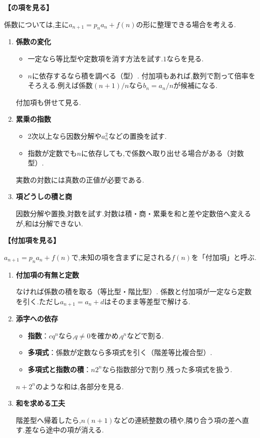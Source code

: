   \medskip
  \noindent \textbf{【の項を見る】}

  係数については,主に$a_{n+1}=p_na_n+f(n)$の形に整理できる場合を考える.
  \begin{enumerate}
    \item \textbf{係数の変化}

      \begin{itemize}[beginpenalty=10000]
        \item 一定なら等比型や定数項を消す方法を試す.$1$ならを見る.
        \item $n$に依存するなら積を調べる（型）.
              付加項もあれば,数列で割って倍率をそろえる.例えば係数$(n+1)/n$なら$b_n=a_n/n$が候補になる.
      \end{itemize}
      付加項も併せて見る.

    \item \textbf{累乗の指数}

      \begin{itemize}[beginpenalty=10000]
        \item 2次以上なら因数分解や$a_n^2$などの置換を試す.
        \item 指数が定数でも$n$に依存しても,で係数へ取り出せる場合がある（対数型）.
      \end{itemize}
      実数の対数には真数の正値が必要である.

    \item \textbf{項どうしの積と商}

      因数分解や置換,対数を試す.対数は積・商・累乗を和と差や定数倍へ変えるが,和は分解できない.
  \end{enumerate}

  \medskip
  \noindent \textbf{【付加項を見る】}

  $a_{n+1}=p_na_n+f(n)$で,未知の項を含まずに足される$f(n)$を「付加項」と呼ぶ.
  \begin{enumerate}
    \item \textbf{付加項の有無と定数}

      なければ係数の積を取る（等比型・階比型）.
      係数と付加項が一定なら定数を引く.ただし$a_{n+1}=a_n+d$はそのまま等差型で解ける.

    \item \textbf{添字への依存}

      \begin{itemize}[beginpenalty=10000]
        \item \textbf{指数}：$cq^n$なら,$q\ne0$を確かめ,$q^n$などで割る.
        \item \textbf{多項式}：係数が定数なら多項式を引く（階差等比複合型）.
        \item \textbf{多項式と指数の積}：$n2^n$なら指数部分で割り,残った多項式を扱う.
      \end{itemize}
      $n+2^n$のような和は,各部分を見る.

    \item \textbf{和を求める工夫}

      階差型へ帰着したら,$n(n+1)$などの連続整数の積や,隣り合う項の差へ直す.差なら途中の項が消える.
  \end{enumerate}

